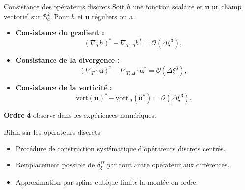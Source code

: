 \documentclass[11pt]{beamer}
\begin{document}
\begin{frame}{Consistance des opérateurs discrets}
Soit $h$ une fonction scalaire et $\mathbf{u}$ un champ vectoriel sur $\mathbb{S}_a^2$. Pour $h$ et $\mathbf{u}$ réguliers on a :
\begin{block}{}
\begin{itemize}
\item \textbf{Consistance du gradient :}
$$
(\nabla_T h)^* - \nabla_{T,\Delta} h^* = \mathcal{O}(\Delta \xi^3),
$$
\item \textbf{Consistance de la divergence :}
$$
(\nabla_T \cdot \mathbf{u})^* - \nabla_{T,\Delta} \cdot \mathbf{u}^* = \mathcal{O}(\Delta \xi^3),
$$
\item \textbf{Consistance de la vorticité :}
$$
\text{vort}(\mathbf{u})^* - \text{vort}_{\Delta}(\mathbf{u}^*) = \mathcal{O}(\Delta \xi^3).
$$
\end{itemize}
\end{block}
\begin{alertblock}{}
\textbf{Ordre 4} observé dans les expériences numériques.
\end{alertblock}
\end{frame}


























\begin{frame}{Bilan sur les opérateurs discrets}
\begin{block}{}
\begin{itemize}
\item Procédure de construction systématique d'opérateurs discrets centrés.
\vspace{.4cm}
\item Remplacement possible de $\delta_{\xi}^H$ par tout autre opérateur aux différences.
\vspace{.4cm}
\item Approximation par spline cubique limite la montée en ordre.
\end{itemize}
\end{block}
\end{frame}
\end{document}
